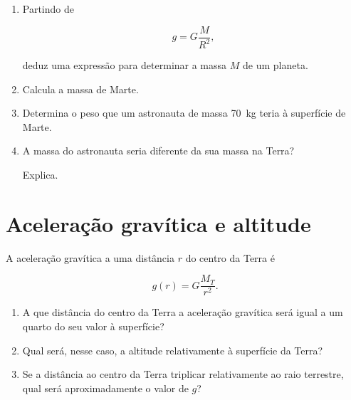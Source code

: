 \documentclass[11pt,a4paper]{article}
\newcommand{\resposta}[1][1]{
	\vspace{#1cm}
}
\begin{document}
	\begin{enumerate}[label=\textbf{\arabic*.},resume]
		
		\item Partindo de
		
		\[
		g=
		G\frac{M}{R^2},
		\]
		
		deduz uma expressão para determinar a massa $M$ de um planeta.
		
		\resposta[0.8]
		
		\item Calcula a massa de Marte.
		
		\resposta[1.3]
		
		\item Determina o peso que um astronauta de massa \SI{70}{\kilogram}
		teria à superfície de Marte.
		
		\resposta[0.9]
		
		\item A massa do astronauta seria diferente da sua massa na Terra?
		
		Explica.
		
		\resposta[0.8]
		
	\end{enumerate}
	
	\section{Aceleração gravítica e altitude}
	
	A aceleração gravítica a uma distância $r$ do centro da Terra é
	
	\[
	g(r)=G\frac{M_T}{r^2}.
	\]
	
	\begin{enumerate}[label=\textbf{\arabic*.},resume]
		
		\item A que distância do centro da Terra a aceleração gravítica será
		igual a um quarto do seu valor à superfície?
		
		\resposta[1.3]
		
		\item Qual será, nesse caso, a altitude relativamente à superfície da Terra?
		
		\resposta[1.0]
		
		\item Se a distância ao centro da Terra triplicar relativamente ao raio
		terrestre, qual será aproximadamente o valor de $g$?
		
		\resposta[1.0]
		
	\end{enumerate}
	
\end{document}

